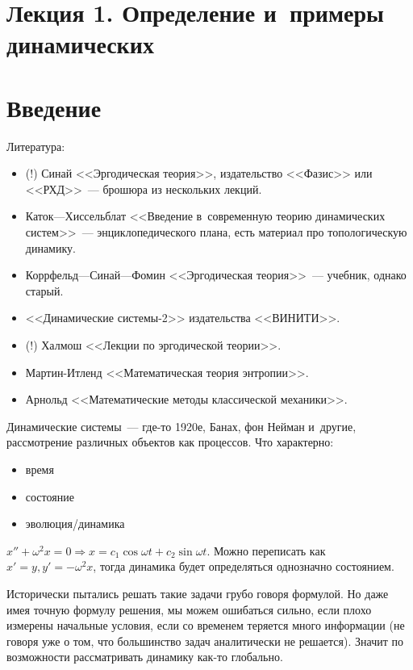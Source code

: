 \documentclass{article}
\begin{document}
\section*{Лекция 1. Определение и~примеры динамических}
\resetcntrs

\section{Введение}

Литература:
\begin{itemize}
	\item (!) Синай <<Эргодическая теория>>, издательство <<Фазис>> или
		<<РХД>>~--- брошюра из нескольких лекций.
	\item Каток---Хиссельблат <<Введение в~современную теорию динамических
		систем>>~--- энциклопедического плана, есть материал про топологическую
		динамику.
	\item Коррфельд---Синай---Фомин <<Эргодическая теория>>~--- учебник, однако
		старый.
	\item <<Динамические системы-2>> издательства <<ВИНИТИ>>.
	\item (!) Халмош <<Лекции по эргодической теории>>.
	\item Мартин-Итленд <<Математическая теория энтропии>>.
	\item Арнольд <<Математические методы классической механики>>.
\end{itemize}

Динамические системы~--- где-то 1920е, Банах, фон Нейман и~другие, рассмотрение
различных объектов как процессов. Что характерно:
\begin{itemize}
	\item время
	\item состояние
	\item эволюция/динамика
\end{itemize}

\begin{example}
	$x'' + \omega^2 x = 0 \Rightarrow x = c_1 \cos \omega t + c_2 \sin \omega t$.
	Можно переписать как~$x' = y, y' = -\omega^2 x$, тогда динамика будет
	определяться однозначно состоянием.
\end{example}

Исторически пытались решать такие задачи грубо говоря формулой. Но даже имея
точную формулу решения, мы можем ошибаться сильно, если плохо измерены
начальные условия, если со временем теряется много информации (не говоря уже о
том, что большинство задач аналитически не решается).  Значит по возможности
рассматривать динамику как-то глобально.
\end{document}
